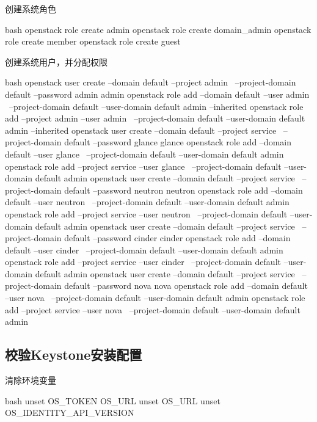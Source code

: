 创建系统角色

\begin{code-block}{bash}
openstack role create admin
openstack role create domain_admin
openstack role create member
openstack role create guest
\end{code-block}

创建系统用户，并分配权限

\begin{long-block}{bash}
openstack user create --domain default --project admin \
    --project-domain default --password admin admin
openstack role add --domain default --user admin \
    --project-domain default --user-domain default admin  --inherited
openstack role add --project admin --user admin \
    --project-domain default --user-domain default admin  --inherited
openstack user create --domain default --project service \
    --project-domain default --password glance glance
openstack role add --domain default --user glance \
    --project-domain default --user-domain default admin
openstack role add --project service --user glance \
    --project-domain default --user-domain default admin
openstack user create --domain default --project service \
    --project-domain default --password neutron neutron
openstack role add --domain default --user neutron \
    --project-domain default --user-domain default admin
openstack role add --project service --user neutron \
    --project-domain default --user-domain default admin
openstack user create --domain default --project service \
    --project-domain default --password cinder  cinder
openstack role add --domain default --user cinder \
    --project-domain default --user-domain default admin
openstack role add --project service --user cinder \
    --project-domain default --user-domain default admin
openstack user create --domain default --project service \
    --project-domain default --password nova nova
openstack role add --domain default --user nova \
    --project-domain default --user-domain default admin
openstack role add --project service --user nova \
    --project-domain default --user-domain default admin
\end{long-block}

\subsection{校验Keystone安装配置}

清除环境变量

\begin{code-block}{bash}
unset OS_TOKEN OS_URL
unset OS_URL
unset OS_IDENTITY_API_VERSION
\end{code-block}

